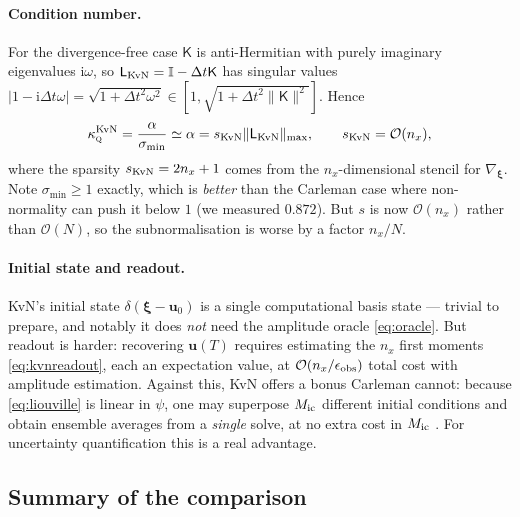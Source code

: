 \documentclass[11pt,a4paper]{article}
\theoremstyle{plain}
\theoremstyle{definition}
\theoremstyle{remark}
\newcommand{\Oh}{\mathcal{O}}
\newcommand{\norm}[1]{\lVert #1 \rVert}
\newcommand{\abs}[1]{\lvert #1 \rvert}
\newcommand{\ii}{\mathrm{i}}
\newcommand{\Id}{\mathbb{I}}
\newcommand{\uvec}{\bm{u}}
\newcommand{\Lmat}{\mathsf{L}}
\newcommand{\kQ}{\kappa_{\textsc{q}}}
\begin{document}
\paragraph{Condition number.}  For the divergence-free case $\mathsf{K}$ is
anti-Hermitian with purely imaginary eigenvalues $\ii\omega$, so
$\Lmat_{\rm KvN}=\Id-\Delta t\mathsf{K}$ has singular values
$\abs{1-\ii\Delta t\omega}=\sqrt{1+\Delta t^{2}\omega^{2}}\in[1,\sqrt{1+\Delta t^2\norm{\mathsf{K}}^2}]$.
Hence
\begin{equation}
\kQ^{\rm KvN}=\frac{\alpha}{\sigma_{\min}}\simeq\alpha
=s_{\rm KvN}\norm{\Lmat_{\rm KvN}}_{\max},
\qquad
s_{\rm KvN}=\Oh(n_x),
\end{equation}
where the sparsity $s_{\rm KvN}=2n_x+1$ comes from the $n_x$-dimensional
stencil for $\nabla_{\bm\xi}$.  Note $\sigma_{\min}\ge1$ exactly, which is
\emph{better} than the Carleman case where non-normality can push it below $1$
(we measured $0.872$).  But $s$ is now $\Oh(n_x)$ rather than $\Oh(N)$, so the
subnormalisation is worse by a factor $n_x/N$.

\paragraph{Initial state and readout.}  KvN's initial state
$\delta(\bm\xi-\uvec_0)$ is a single computational basis state --- trivial to
prepare, and notably it does \emph{not} need the amplitude oracle
\eqref{eq:oracle}.  But readout is harder: recovering $\uvec(T)$ requires
estimating the $n_x$ first moments \eqref{eq:kvnreadout}, each an expectation
value, at $\Oh(n_x/\epsilon_{\rm obs})$ total cost with amplitude estimation.
Against this, KvN offers a bonus Carleman cannot: because \eqref{eq:liouville}
is linear in $\psi$, one may superpose $M_{\rm ic}$ different initial conditions
and obtain ensemble averages from a \emph{single} solve, at no extra cost in
$M_{\rm ic}$ \cite{JinLiu2022}.  For uncertainty quantification this is a real
advantage.

\subsection{Summary of the comparison}
\end{document}
